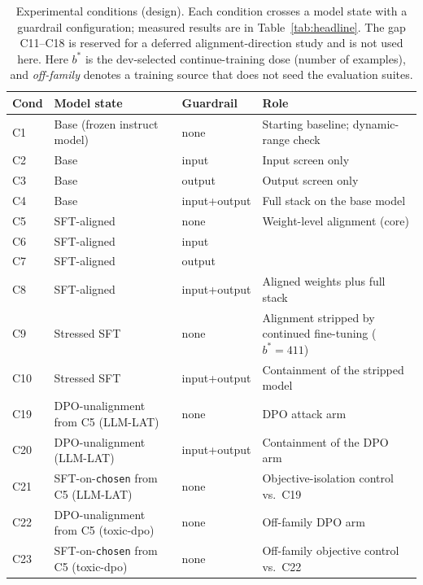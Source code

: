 \documentclass[11pt,a4paper]{article}
\newcommand{\code}[1]{\texttt{#1}}
\begin{document}
\begin{table}[h]
\centering
\caption{Experimental conditions (design). Each condition crosses a model state with a
guardrail configuration; measured results are in Table~\ref{tab:headline}. The gap C11--C18 is
reserved for a deferred alignment-direction study and is not used here. Here $b^{*}$ is the
dev-selected continue-training dose (number of examples), and \emph{off-family} denotes a training
source that does not seed the evaluation suites.}
\label{tab:conditions}
\small
\begin{tabular}{@{}l >{\raggedright\arraybackslash}p{} l >{\raggedright\arraybackslash}p{}@{}}
\toprule
Cond & Model state & Guardrail & Role \\
\midrule
C1  & Base (frozen instruct model) & none         & Starting baseline; dynamic-range check \\
C2  & Base                         & input        & Input screen only \\
C3  & Base                         & output       & Output screen only \\
C4  & Base                         & input+output & Full stack on the base model \\
C5  & SFT-aligned                  & none         & Weight-level alignment (core) \\
C6  & SFT-aligned                  & input        & \\
C7  & SFT-aligned                  & output       & \\
C8  & SFT-aligned                  & input+output & Aligned weights plus full stack \\
C9  & Stressed SFT      & none         & Alignment stripped by continued fine-tuning ($b^{*}=411$) \\
C10 & Stressed SFT      & input+output & Containment of the stripped model \\
\addlinespace
C19 & DPO-unalignment from C5 (LLM-LAT)          & none         & DPO attack arm \\
C20 & DPO-unalignment (LLM-LAT)                  & input+output & Containment of the DPO arm \\
C21 & SFT-on-\code{chosen} from C5 (LLM-LAT)     & none         & Objective-isolation control vs.\ C19 \\
C22 & DPO-unalignment from C5 (toxic-dpo)        & none         & Off-family DPO arm \\
C23 & SFT-on-\code{chosen} from C5 (toxic-dpo)   & none         & Off-family objective control vs.\ C22 \\
\bottomrule
\end{tabular}
\end{table}
\end{document}
